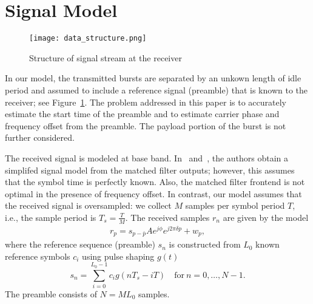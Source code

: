 \section{Signal Model}%
\label{sec:model}

\begin{figure}[t]
  \centerline{\texttt{[image: data\_structure.png]}}
  \caption{Structure of signal stream at the receiver}
  \label{fig:data_structure}
  \end{figure}

In our model, the transmitted bursts are separated by an unkown length of idle period and assumed to
include a reference signal (preamble) that is known to the receiver;
see Figure~\ref{fig:data_structure}. 
The problem addressed in this paper is to accurately estimate the
start time of the preamble and to estimate carrier phase and frequency
offset from the preamble. 
The payload portion of the burst is not further considered. 

The received signal is modeled at base band.
In~\cite{Morelli_Mengali_98} and~\cite{Ramakrishnan_10}, 
the authors obtain a simplifed signal model from the matched filter
outputs;
however, this assumes that the symbol time is perfectly known.
Also, the matched filter frontend is not optimal in the presence of
frequency offset.
In contrast, our model assumes that the received signal is
oversampled: we collect $M$ samples per symbol period $T$, i.e., the
sample period is $T_s=\frac{T}{M}$. 
The received samples $r_n$ are given by the model
\begin{equation}
    \begin{aligned}
      \label{eq:model}
      r_p = s_{p-\bar{p}}Ae^{j\phi}e^{j2\pi\delta p}+w_{p},
    \end{aligned}
  \end{equation}
where the reference sequence (preamble) $s_n$ is constructed from
$L_0$ known reference symbols $c_i$ using pulse shaping $g(t)$
\begin{equation}
  \label{eq:l_ref_sig_discrete}
  s_n=\sum_{i=0}^{L_0-1} c_i g(nT_s-iT) \quad \text{for}~n=0,\ldots,N-1.
\end{equation}
The preamble consists of $N=M L_0$ samples.  
  
